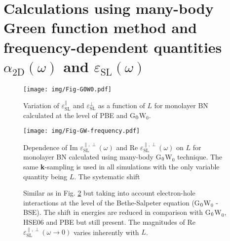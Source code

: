 \documentclass[manuscript=suppinfo,email=true,hyperref=true,keywords=false]{achemso}
\begin{document}
\pagebreak{}

\section{Calculations using many-body Green function method and frequency-dependent quantities $\alpha_{\mathrm{2D}}(\omega)$ and $\varepsilon_{\mathrm{SL}}(\omega)$} 


\begin{figure}[htbp]
  \centering
 \texttt{[image: img/Fig-G0W0.pdf]}
  \caption{Variation of $\varepsilon^{\parallel}_{\mathrm{SL}}$ and
$\varepsilon^{\perp}_{\mathrm{SL}}$ as a function of $L$ for monolayer BN 
calculated at the level of PBE and G$_{\rm 0}$W$_{0}$.  
}
  \label{fig:S1}
\end{figure}

\begin{figure}[htbp]
  \centering
 \texttt{[image: img/Fig-GW-frequency.pdf]}
  \caption{Dependence of Im $\varepsilon^{\parallel,\perp}_{\mathrm{SL}}(\omega)$ and
Re $\varepsilon^{\parallel,\perp}_{\mathrm{SL}}(\omega)$ on $L$ for monolayer BN calculated using 
many-body G$_{\rm 0}$W$_{0}$ technique. The same {\bf k}-sampling is used in all simulations 
with the only variable quantity being $L$. The systematic shift 
}
  \label{fig:S2}
\end{figure}


\begin{figure}[htbp]
  \centering
  \caption{Similar as in Fig. \ref{fig:S2} but taking into account electron-hole interactions at the level of 
  the Bethe-Salpeter equation (G$_{\rm 0}$W$_{0}$ - BSE). 
  The shift in energies are reduced in comparison with G$_{\rm 0}$W$_{0}$, HSE06 and PBE but still present. 
  The magnitudes of Re $\varepsilon^{\parallel,\perp}_{\mathrm{SL}}(\omega \to 0)$ varies inherently with $L$.  
}
  \label{fig:S3}
\end{figure}

%
%
\end{document}
